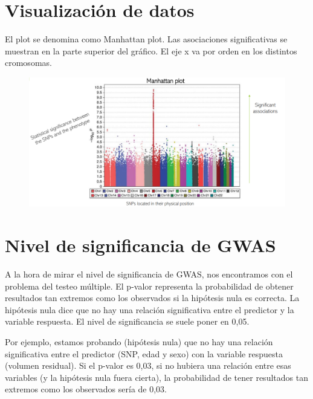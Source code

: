 \section{Visualización de datos}
El plot se denomina como Manhattan plot. Las asociaciones significativas se muestran en la parte superior del gráfico. El eje x va por orden en los distintos cromosomas. 

\begin{figure}[htbp]
\centering
\includegraphics[width = \textwidth]{figs/manhattan-plot.png}
\end{figure}

\section{Nivel de significancia de GWAS}
A la hora de mirar el nivel de significancia de GWAS, nos encontramos con el problema del testeo múltiple. El p-valor representa la probabilidad de obtener resultados tan extremos como los observados si la hipótesis nula es correcta. La hipótesis nula dice que no hay una relación significativa entre el predictor y la variable respuesta. El nivel de significancia se suele poner en 0,05. 

Por ejemplo, estamos probando (hipótesis nula) que no hay una relación significativa entre el predictor (SNP, edad y sexo) con la variable respuesta (volumen residual). Si el p-valor es 0,03, si no hubiera una relación entre esas variables (y la hipótesis nula fuera cierta), la probabilidad de tener resultados tan extremos como los observados sería de 0,03. 

